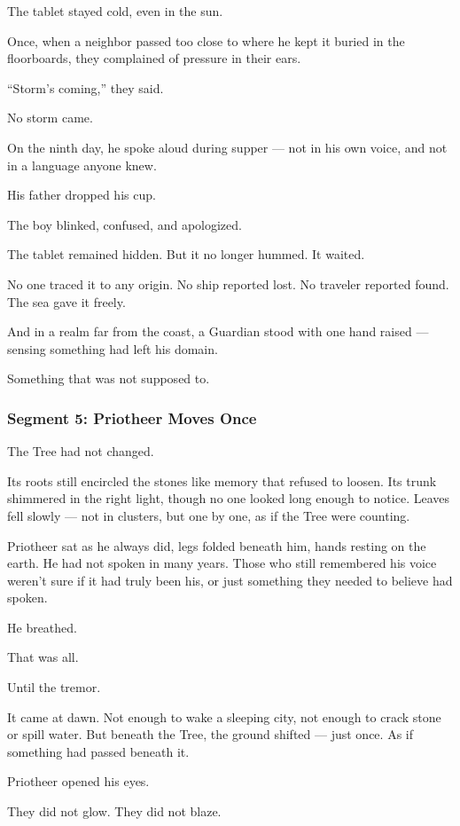 \documentclass[9pt]{article}
\begin{document}
The tablet stayed cold, even in the sun.

Once, when a neighbor passed too close to where he kept it buried in the floorboards, they complained of pressure in their ears.

``Storm’s coming,'' they said.

No storm came.

On the ninth day, he spoke aloud during supper — not in his own voice, and not in a language anyone knew.

His father dropped his cup.

The boy blinked, confused, and apologized.

The tablet remained hidden. But it no longer hummed. It waited.

No one traced it to any origin. No ship reported lost. No traveler reported found. The sea gave it freely.

And in a realm far from the coast, a Guardian stood with one hand raised — sensing something had left his domain.

Something that was not supposed to.


\newpage

\subsubsection*{Segment 5: Priotheer Moves Once}

The Tree had not changed.

Its roots still encircled the stones like memory that refused to loosen. Its trunk shimmered in the right light, though no one looked long enough to notice. Leaves fell slowly — not in clusters, but one by one, as if the Tree were counting.

Priotheer sat as he always did, legs folded beneath him, hands resting on the earth. He had not spoken in many years. Those who still remembered his voice weren’t sure if it had truly been his, or just something they needed to believe had spoken.

He breathed.

That was all.

Until the tremor.

It came at dawn. Not enough to wake a sleeping city, not enough to crack stone or spill water. But beneath the Tree, the ground shifted — just once. As if something had passed beneath it.

Priotheer opened his eyes.

They did not glow. They did not blaze.
\end{document}
